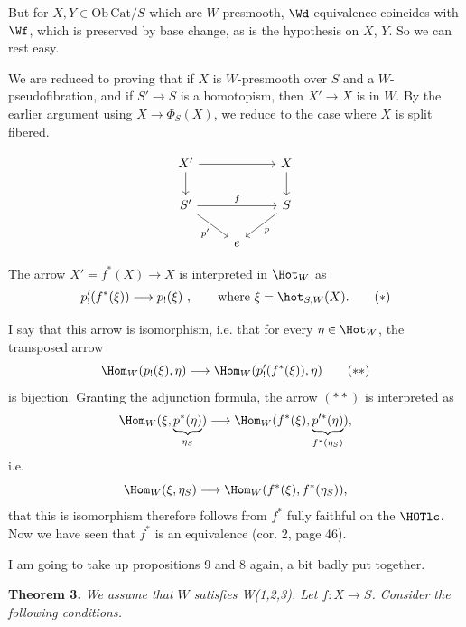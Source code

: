 But for $X, Y \in \mathrm{Ob}\,\mathrm{Cat}/S$ which are $W$-presmooth, $\Wd$-equivalence coincides with $\Wf$, which is preserved by base change, as is the hypothesis on $X$, $Y$. So we can rest easy.

We are reduced to proving that if $X$ is $W$-presmooth over $S$ and a $W$-pseudofibration, and if $S' \longrightarrow S$ is a homotopism, then $X' \longrightarrow X$ is in $W$. By the earlier argument using $X \longrightarrow \Phi_S(X)$, we reduce to the case where $X$ is split fibered.


\[ \begin{tikzcd}
X' \arrow[rr] \arrow[d] & & X \arrow[d] \\
S' \arrow[rr, "f"] \arrow[dr, "p'"'] & & S \arrow[dl, "p"] \\
 & e &
\end{tikzcd} \]

The arrow $X' = f^*(X) \longrightarrow X$ is interpreted in $\Hot_W$ as
\[ p'_!(f^*(\xi)) \longrightarrow p_!(\xi) \ , \qquad \text{where } \xi = \hot_{S,W}(X). \tag*{$(*)$} \]

I say that this arrow is isomorphism, i.e. that for every $\eta \in \Hot_W$, the transposed arrow
\[ \Hom_W(p_!(\xi),\eta) \longrightarrow \Hom_W(p'_!(f^*(\xi)),\eta) \tag*{$(**)$} \]
is bijection. Granting the adjunction formula, the arrow $(**)$ is interpreted as
\[ \Hom_W(\xi,\underbrace{p^*(\eta)}_{\eta_S}) \longrightarrow \Hom_W(f^*(\xi),\underbrace{p'^*(\eta)}_{f^*(\eta_S)}), \]
i.e.
\[ \Hom_W(\xi,\eta_S) \longrightarrow \Hom_W(f^*(\xi),f^*(\eta_S)), \]
that this is isomorphism therefore follows from $f^*$ fully faithful on the $\HOTlc$. Now we have seen that $f^*$ is an equivalence (cor. 2, page 46).

I am going to take up propositions 9 and 8 again, a bit badly put together.

\textbf{Theorem 3.} \textit{We assume that $W$ satisfies \textup{W(1,2,3)}. Let $f : X \longrightarrow S$. Consider the following conditions.}


